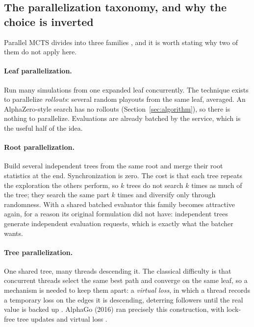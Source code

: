 \subsection{The parallelization taxonomy, and why the choice is inverted}
\label{sec:taxonomy}

Parallel MCTS divides into three families \citep{chaslot2008parallel,
browne2012survey}, and it is worth stating why two of them do not apply here.

\paragraph{Leaf parallelization.} Run many simulations from one expanded leaf
concurrently. The technique exists to parallelize \emph{rollouts}: several random
playouts from the same leaf, averaged. An AlphaZero-style search has no rollouts
(Section~\ref{sec:algorithm}), so there is nothing to parallelize. Evaluations
are already batched by the service, which is the useful half of the idea.

\paragraph{Root parallelization.} Build several independent trees from the same
root and merge their root statistics at the end. Synchronization is zero. The
cost is that each tree repeats the exploration the others perform, so $k$ trees
do not search $k$ times as much of the tree; they search the same part $k$ times
and diversify only through randomness. With a shared batched evaluator this
family becomes attractive again, for a reason its original formulation did not
have: independent trees generate independent evaluation requests, which is
exactly what the batcher wants.

\paragraph{Tree parallelization.} One shared tree, many threads descending it.
The classical difficulty is that concurrent threads select the same best path and
converge on the same leaf, so a mechanism is needed to keep them apart: a
\emph{virtual loss}, in which a thread records a temporary loss on the edges it is
descending, deterring followers until the real value is backed up
\citep{chaslot2008parallel,segal2011paralleluct}. AlphaGo (2016) ran precisely
this construction, with lock-free tree updates and virtual loss
\citep{silver2016alphago}.

